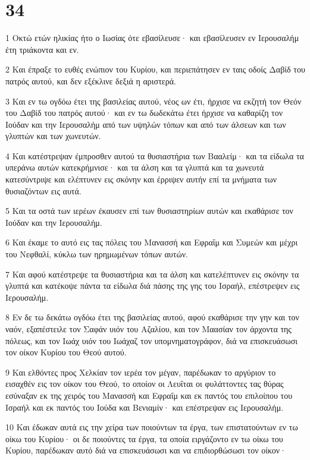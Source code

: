 \chapter{34}

\par 1 Οκτώ ετών ηλικίας ήτο ο Ιωσίας ότε εβασίλευσε· και εβασίλευσεν εν Ιερουσαλήμ έτη τριάκοντα και εν.
\par 2 Και έπραξε το ευθές ενώπιον του Κυρίου, και περιεπάτησεν εν ταις οδοίς Δαβίδ του πατρός αυτού, και δεν εξέκλινε δεξιά η αριστερά.
\par 3 Και εν τω ογδόω έτει της βασιλείας αυτού, νέος ων έτι, ήρχισε να εκζητή τον Θεόν του Δαβίδ του πατρός αυτού· και εν τω δωδεκάτω έτει ήρχισε να καθαρίζη τον Ιούδαν και την Ιερουσαλήμ από των υψηλών τόπων και από των άλσεων και των γλυπτών και των χωνευτών.
\par 4 Και κατέστρεψαν έμπροσθεν αυτού τα θυσιαστήρια των Βααλείμ· και τα είδωλα τα υπεράνω αυτών κατεκρήμνισε· και τα άλση και τα γλυπτά και τα χωνευτά κατεσύντριψε και ελέπτυνεν εις σκόνην και έρριψεν αυτήν επί τα μνήματα των θυσιαζόντων εις αυτά.
\par 5 Και τα οστά των ιερέων έκαυσεν επί των θυσιαστηρίων αυτών και εκαθάρισε τον Ιούδαν και την Ιερουσαλήμ.
\par 6 Και έκαμε το αυτό εις τας πόλεις του Μανασσή και Εφραΐμ και Συμεών και μέχρι του Νεφθαλί, κύκλω των ηρημωμένων τόπων αυτών.
\par 7 Και αφού κατέστρεψε τα θυσιαστήρια και τα άλση και κατελέπτυνεν εις σκόνην τα γλυπτά και κατέκοψε πάντα τα είδωλα διά πάσης της γης του Ισραήλ, επέστρεψεν εις Ιερουσαλήμ.
\par 8 Εν δε τω δεκάτω ογδόω έτει της βασιλείας αυτού, αφού εκαθάρισε την γην και τον ναόν, εξαπέστειλε τον Σαφάν υιόν του Αζαλίου, και τον Μαασίαν τον άρχοντα της πόλεως, και τον Ιωάχ υιόν του Ιωάχαζ τον υπομνηματογράφον, διά να επισκευάσωσι τον οίκον Κυρίου του Θεού αυτού.
\par 9 Και ελθόντες προς Χελκίαν τον ιερέα τον μέγαν, παρέδωκαν το αργύριον το εισαχθέν εις τον οίκον του Θεού, το οποίον οι Λευΐται οι φυλάττοντες τας θύρας εσύναξαν εκ της χειρός του Μανασσή και Εφραΐμ και εκ παντός του επιλοίπου του Ισραήλ και εκ παντός του Ιούδα και Βενιαμίν· και επέστρεψαν εις Ιερουσαλήμ.
\par 10 Και έδωκαν αυτά εις την χείρα των ποιούντων τα έργα, των επιστατούντων εν τω οίκω του Κυρίου· οι δε ποιούντες τα έργα, τα οποία ειργάζοντο εν τω οίκω του Κυρίου, παρέδωκαν αυτό διά να επισκευάσωσι και να επιδιορθώσωσι τον οίκον·
